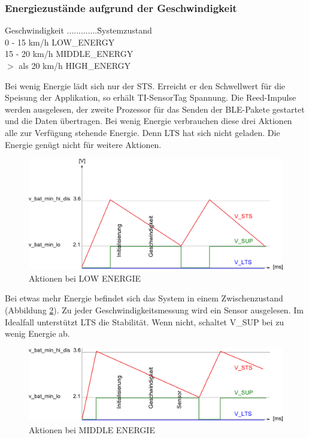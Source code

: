 \subsubsection*{Energiezustände aufgrund der Geschwindigkeit}
\begin{tabbing}
   Geschwindigkeit .............\quad\= Systemzustand\\[0.8ex]
   0 - 15 km/h        \> LOW\_ENERGY\\
   15 - 20 km/h       \> MIDDLE\_ENERGY\\
   $>$ als 20 km/h    \> HIGH\_ENERGY\\    
\end{tabbing}

Bei wenig Energie lädt sich nur der STS. Erreicht er den Schwellwert für die Speisung der Applikation, so erhält TI-SensorTag Spannung. Die Reed-Impulse werden ausgelesen, der zweite Prozessor für das Senden der BLE-Pakete gestartet und die Daten übertragen. Bei wenig Energie verbrauchen diese drei Aktionen alle zur Verfügung stehende Energie. Denn LTS hat sich nicht geladen. Die Energie genügt nicht für weitere Aktionen.

\begin{figure}[ht]
  \includegraphics[width=1.0\textwidth]{3Vorgehen/imag/LOW_ENERGY.png}
  \caption{Aktionen bei LOW ENERGIE}
  \label{LOW_ENER}
\end{figure}

Bei etwas mehr Energie befindet sich das System in einem Zwischenzustand (Abbildung \ref{MID_ENER}). Zu jeder Geschwindigkeitsmessung wird ein Sensor ausgelesen. Im Idealfall unterstützt LTS die Stabilität. Wenn nicht, schaltet V\_SUP bei zu wenig Energie ab.

\begin{figure}[ht]
  \includegraphics[width=1.0\textwidth]{3Vorgehen/imag/MIDDLE_ENERGY.png}
  \caption{Aktionen bei MIDDLE ENERGIE}
  \label{MID_ENER}
\end{figure}

